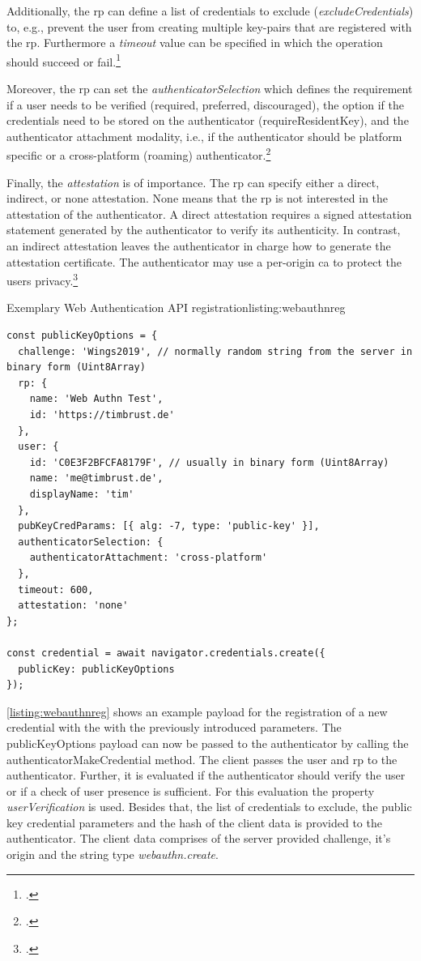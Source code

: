 Additionally, the \gls{rp} can define a list of credentials to exclude (\textit{excludeCredentials}) to, e.g., prevent the user from creating multiple key-pairs that are registered with the \gls{rp}. Furthermore a \textit{timeout} value can be specified in which the operation should succeed or fail.\footcites[See][Chapter 5.4]{w3c}

Moreover, the \gls{rp} can set the \textit{authenticatorSelection} which defines the requirement if a user needs to be verified (\frqq required\flqq, \frqq preferred\flqq, \frqq discouraged\flqq), the option if the credentials need to be stored on the authenticator (\frqq requireResidentKey\flqq), and the authenticator attachment modality, i.e., if the authenticator should be platform specific or a cross-platform (roaming) authenticator.\footcites[See][Chapter 6.2.1]{w3c}

Finally, the \textit{attestation} is of importance. The \gls{rp} can specify either a direct, indirect, or none attestation. None means that the \gls{rp} is not interested in the attestation of the authenticator. A direct attestation requires a signed attestation statement generated by the authenticator to verify its authenticity. In contrast, an indirect attestation leaves the authenticator in charge how to generate the attestation certificate. The authenticator may use a per-origin \gls{ca} to protect the users privacy.\footcites[See][Chapter 5.4.6]{w3c}

\begin{example}{Exemplary Web Authentication API registration}{listing:webauthnreg}
\begin{verbatim}
const publicKeyOptions = {
  challenge: 'Wings2019', // normally random string from the server in binary form (Uint8Array)
  rp: {
    name: 'Web Authn Test',
    id: 'https://timbrust.de'
  },
  user: {
    id: 'C0E3F2BFCFA8179F', // usually in binary form (Uint8Array)
    name: 'me@timbrust.de',
    displayName: 'tim'
  },
  pubKeyCredParams: [{ alg: -7, type: 'public-key' }],
  authenticatorSelection: {
    authenticatorAttachment: 'cross-platform'
  },
  timeout: 600,
  attestation: 'none'
};

const credential = await navigator.credentials.create({
  publicKey: publicKeyOptions
});
\end{verbatim}
\end{example}

\autoref{listing:webauthnreg} shows an example payload for the registration of a new credential with the \wa{} with the previously introduced parameters. The publicKeyOptions payload can now be passed to the authenticator by calling the authenticatorMakeCredential method. The client passes the user and \gls{rp} to the authenticator. Further, it is evaluated if the authenticator should verify the user or if a check of user presence is sufficient. For this evaluation the property \textit{userVerification} is used. Besides that, the list of credentials to exclude, the public key credential parameters and the hash of the client data is provided to the authenticator. The client data comprises of the server provided challenge, it's origin and the string type \textit{webauthn.create}.

